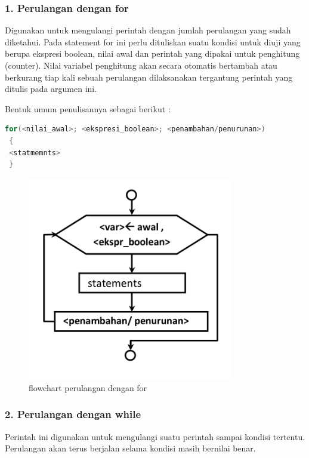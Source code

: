 \subsubsection{1. Perulangan dengan for}\label{perulangan-dengan-for}

Digunakan untuk mengulangi perintah dengan jumlah perulangan yang sudah
diketahui. Pada statement for ini perlu dituliskan suatu kondisi untuk
diuji yang berupa ekspresi boolean, nilai awal dan perintah yang dipakai
untuk penghitung (counter). Nilai variabel penghitung akan secara
otomatis bertambah atau berkurang tiap kali sebuah perulangan
dilaksanakan tergantung perintah yang ditulis pada argumen ini.

Bentuk umum penulisannya sebagai berikut :

\begin{lstlisting}[language=c++, numbers=none]
 for(<nilai_awal>; <ekspresi_boolean>; <penambahan/penurunan>)
 {
 <statmemnts>
 }
\end{lstlisting}

\begin{figure}[htbp]
\centering
\includegraphics[width=0.8\textwidth]{images/capture2-8.png}
\caption{flowchart perulangan dengan for}
\end{figure}

\subsubsection{2. Perulangan dengan while}\label{perulangan-dengan-while}

Perintah ini digunakan untuk mengulangi suatu perintah sampai kondisi
tertentu. Perulangan akan terus berjalan selama kondisi masih bernilai
benar.

